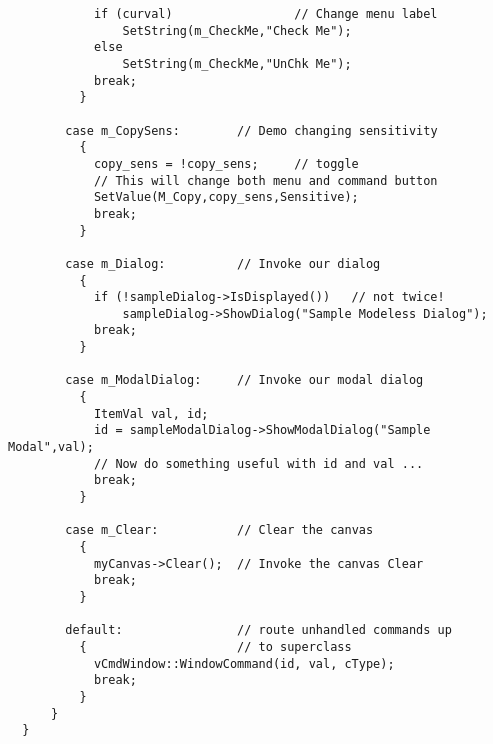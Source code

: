 \begin{verbatim}
            if (curval)                 // Change menu label
                SetString(m_CheckMe,"Check Me");
            else
                SetString(m_CheckMe,"UnChk Me");
            break;
          }

        case m_CopySens:        // Demo changing sensitivity
          {
            copy_sens = !copy_sens;     // toggle
            // This will change both menu and command button
            SetValue(M_Copy,copy_sens,Sensitive);
            break;
          }

        case m_Dialog:          // Invoke our dialog
          {
            if (!sampleDialog->IsDisplayed())   // not twice!
                sampleDialog->ShowDialog("Sample Modeless Dialog");
            break;
          }

        case m_ModalDialog:     // Invoke our modal dialog
          {
            ItemVal val, id;
            id = sampleModalDialog->ShowModalDialog("Sample Modal",val);
            // Now do something useful with id and val ...
            break;
          }

        case m_Clear:           // Clear the canvas
          {
            myCanvas->Clear();  // Invoke the canvas Clear
            break;
          }

        default:                // route unhandled commands up
          {                     // to superclass
            vCmdWindow::WindowCommand(id, val, cType);
            break;
          }
      }
  }
\end{verbatim}
\normalfont\normalsize

